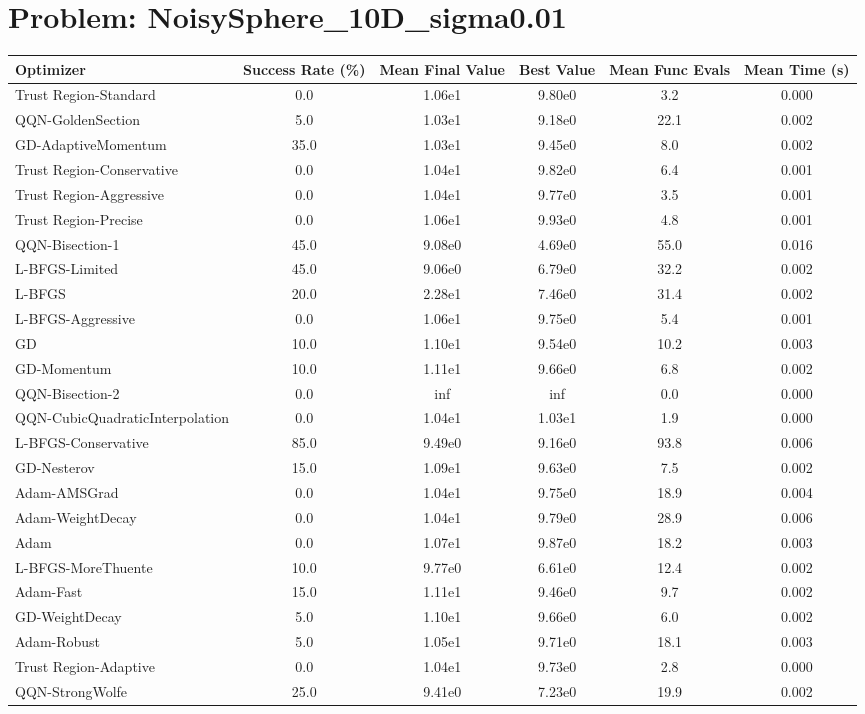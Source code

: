 \documentclass{article}
\begin{document}
\section{Problem: NoisySphere\_10D\_sigma0.01}
\begin{longtable}{p{3cm}*{5}{c}}
\toprule
\textbf{Optimizer} & \textbf{Success Rate (\%)} & \textbf{Mean Final Value} & \textbf{Best Value} & \textbf{Mean Func Evals} & \textbf{Mean Time (s)} \\
\midrule
Trust Region-Standard & 0.0 & 1.06e1 & 9.80e0 & 3.2 & 0.000 \\
QQN-GoldenSection & 5.0 & 1.03e1 & 9.18e0 & 22.1 & 0.002 \\
GD-AdaptiveMomentum & 35.0 & 1.03e1 & 9.45e0 & 8.0 & 0.002 \\
Trust Region-Conservative & 0.0 & 1.04e1 & 9.82e0 & 6.4 & 0.001 \\
Trust Region-Aggressive & 0.0 & 1.04e1 & 9.77e0 & 3.5 & 0.001 \\
Trust Region-Precise & 0.0 & 1.06e1 & 9.93e0 & 4.8 & 0.001 \\
QQN-Bisection-1 & 45.0 & 9.08e0 & 4.69e0 & 55.0 & 0.016 \\
L-BFGS-Limited & 45.0 & 9.06e0 & 6.79e0 & 32.2 & 0.002 \\
L-BFGS & 20.0 & 2.28e1 & 7.46e0 & 31.4 & 0.002 \\
L-BFGS-Aggressive & 0.0 & 1.06e1 & 9.75e0 & 5.4 & 0.001 \\
GD & 10.0 & 1.10e1 & 9.54e0 & 10.2 & 0.003 \\
GD-Momentum & 10.0 & 1.11e1 & 9.66e0 & 6.8 & 0.002 \\
QQN-Bisection-2 & 0.0 & inf & inf & 0.0 & 0.000 \\
QQN-CubicQuadraticInterpolation & 0.0 & 1.04e1 & 1.03e1 & 1.9 & 0.000 \\
L-BFGS-Conservative & 85.0 & 9.49e0 & 9.16e0 & 93.8 & 0.006 \\
GD-Nesterov & 15.0 & 1.09e1 & 9.63e0 & 7.5 & 0.002 \\
Adam-AMSGrad & 0.0 & 1.04e1 & 9.75e0 & 18.9 & 0.004 \\
Adam-WeightDecay & 0.0 & 1.04e1 & 9.79e0 & 28.9 & 0.006 \\
Adam & 0.0 & 1.07e1 & 9.87e0 & 18.2 & 0.003 \\
L-BFGS-MoreThuente & 10.0 & 9.77e0 & 6.61e0 & 12.4 & 0.002 \\
Adam-Fast & 15.0 & 1.11e1 & 9.46e0 & 9.7 & 0.002 \\
GD-WeightDecay & 5.0 & 1.10e1 & 9.66e0 & 6.0 & 0.002 \\
Adam-Robust & 5.0 & 1.05e1 & 9.71e0 & 18.1 & 0.003 \\
Trust Region-Adaptive & 0.0 & 1.04e1 & 9.73e0 & 2.8 & 0.000 \\
QQN-StrongWolfe & 25.0 & 9.41e0 & 7.23e0 & 19.9 & 0.002 \\
\bottomrule
\end{longtable}
\end{document}
